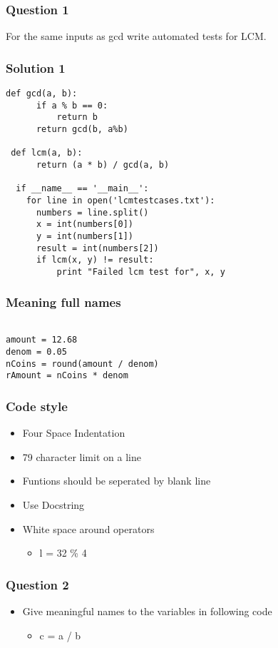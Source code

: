 \documentclass[presentation]{beamer}
\begin{document}
\begin{frame}
\frametitle{Question 1}
\label{sec-5}

  For the same inputs as gcd write automated tests for LCM.
\end{frame}
\begin{frame}[fragile]
\frametitle{Solution 1}
\label{sec-6}

\begin{verbatim}
def gcd(a, b):
      if a % b == 0: 
          return b
      return gcd(b, a%b)

 def lcm(a, b):
      return (a * b) / gcd(a, b)

  if __name__ == '__main__':
    for line in open('lcmtestcases.txt'):
      numbers = line.split()
      x = int(numbers[0])
      y = int(numbers[1])
      result = int(numbers[2])
      if lcm(x, y) != result:
          print "Failed lcm test for", x, y
\end{verbatim}
\end{frame}
\begin{frame}[fragile]
\frametitle{Meaning full names}
\label{sec-7}

\begin{verbatim}

amount = 12.68
denom = 0.05
nCoins = round(amount / denom)
rAmount = nCoins * denom
\end{verbatim}
\end{frame}
\begin{frame}
\frametitle{Code style}
\label{sec-8}

\begin{itemize}
\item Four Space Indentation
\item 79 character limit on a line
\item Funtions should be seperated by 
   blank line
\item Use Docstring
\item White space around operators

\begin{itemize}
\item l = 32 \% 4
\end{itemize}

\end{itemize}
\end{frame}
\begin{frame}
\frametitle{Question 2}
\label{sec-9}

\begin{itemize}
\item Give meaningful names to the variables in following
     code

\begin{itemize}
\item c = a / b
\end{itemize}

\end{itemize}
\end{frame}
\end{document}
